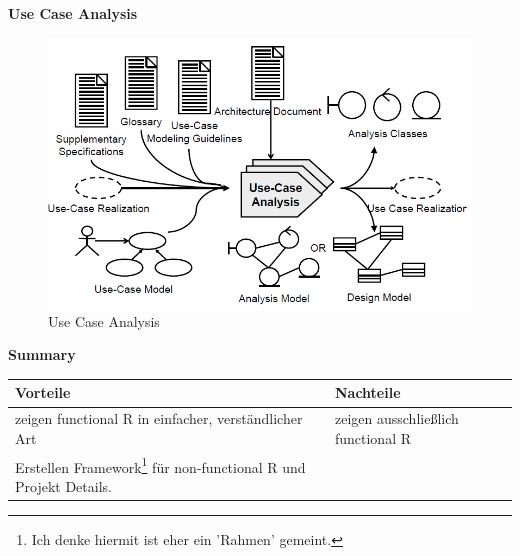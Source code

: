 \newpage
\textbf{Use Case Analysis}
\begin{figure}[!h]
	\centering
	\includegraphics[scale=0.4]{img/use_case_analysis.png}
	\caption{Use Case Analysis}
\end{figure}

\textbf{Summary}\\
\begin{table}[!h]
	\begin{tabular}{p{20em}|p{20em}}
		Vorteile & Nachteile\\
		\hline
		zeigen functional R in einfacher, verständlicher Art & zeigen ausschließlich functional R\\
		Erstellen Framework\footnote{Ich denke hiermit ist eher ein 'Rahmen' gemeint.} für non-functional R und Projekt Details. & 
	\end{tabular}
\end{table}

